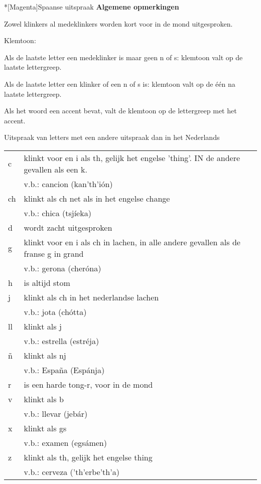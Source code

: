 \begin{song}*[Magenta]{Spaanse uitspraak}
\vspace{-20pt}
\textbf{Algemene opmerkingen}
\vspace{-12pt}
\begin{compactenum}
\item Zowel klinkers al medeklinkers worden kort voor in de mond uitgesproken.
\item Klemtoon:
\begin{compactenum}
\item Als de laatste letter een medeklinker is maar geen n of s: klemtoon valt op de laatste lettergreep.
\item Als de laatste letter een klinker of een n of s is: klemtoon valt op de \'e\'en na laatste lettergreep.
\item Als het woord een accent bevat, valt de klemtoon op de lettergreep met het accent.
\end{compactenum}
\end{compactenum}

Uitspraak van letters met een andere uitspraak dan in het Nederlands\\
\begin{tabularx}{1.0\textwidth}{l l}
c & klinkt voor en i als th, gelijk het engelse 'thing'. IN de andere gevallen als een k.\\
 & v.b.: cancion (kan'th'i\'on)\\
ch & klinkt als ch net als in het engelse change\\
 & v.b.: chica (tsj\'ieka)\\
d & wordt zacht uitgesproken\\
g & klinkt voor en i als ch in lachen, in alle andere gevallen als de franse g in grand\\
 & v.b.: gerona (cher\'ona)\\
h & is altijd stom\\
j & klinkt als ch in het nederlandse lachen\\
 & v.b.: jota (ch\'otta)\\
ll & klinkt als j\\
 & v.b.: estrella (estr\'eja)\\
\~{n} & klinkt als nj\\
 & v.b.: Espa\~na (Esp\'anja)\\
r & is een harde tong-r, voor in de mond\\
v & klinkt als b\\
 & v.b.: llevar (jeb\'ar)\\
x & klinkt als gs\\
 & v.b.: examen (egs\'amen)\\
z & klinkt als th, gelijk het engelse thing\\
 & v.b.: cerveza ('th'erbe'th'a)\\
\end{tabularx}


\end{song}
